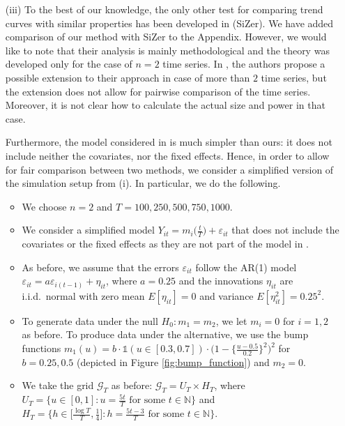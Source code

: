 \documentclass[a4paper,12pt]{article}
\begin{document}
\begin{enumerate}[label=\arabic*.,leftmargin=0.6cm]
{\begin{itemize}[topsep=0pt]
\item[(iii)] To the best of our knowledge, the only other test for comparing trend curves with similar properties has been developed in \cite{Park2009} (SiZer). We have added comparison of our method with SiZer to the Appendix. However, we would like to note that their analysis is mainly methodological and the theory was developed only for the case of $n=2$ time series. In \cite{Park2009}, the authors propose a possible extension to their approach in case of more than $2$ time series, but the extension does not allow for pairwise comparison of the time series. Moreover, it is not clear how to calculate the actual size and power in that case.

Furthermore, the model considered in \cite{Park2009} is much simpler than ours: it does not include neither the covariates, nor the fixed effects. Hence, in order to allow for fair comparison between two methods, we consider a simplified version of the simulation setup from (i). In particular, we do the following.

\begin{itemize}[label=--,leftmargin=0.45cm,itemsep=0pt]

\item We choose $n=2$ and $T=100,250,500, 750, 1000$.

\item We consider a simplified model $Y_{it} = m_i\big(\frac{t}{T}\big) + \varepsilon_{it}$ that does not include the covariates or the fixed effects as they are not part of the model in \cite{Park2009}.
\item As before, we assume that the errors $\varepsilon_{it}$ follow the AR(1) model $\varepsilon_{it} = a \varepsilon_{i(t-1)} + \eta_{it}$, where $a=0.25$ and the innovations $\eta_{it}$ are i.i.d.\ normal with zero mean $E[\eta_{it}]=0$ and variance $E[\eta_{it}^2]=0.25^2$. 

\item To generate data under the null $H_0: m_1 = m_2$, we let $m_i = 0$ for $i=1, 2$ as before. To produce data under the alternative, we use the bump functions $m_1(u) = b \cdot \mathbb{1}(u \in [0.3, 0.7]) \cdot \big(1 - \big\{\frac{u - 0.5}{0.2}\big\}^2\big)^2$ for $b = 0.25, 0.5$ (depicted in Figure \ref{fig:bump_function}) and $m_2 = 0$.

\item We take the grid $\mathcal{G}_T$ as before: $\mathcal{G}_T = U_T \times H_T$, where $U_T = \big\{ u \in [0,1]: u = \textstyle{\frac{5t}{T}} \text{ for some } t \in \mathbb{N} \big\}$ and $H_T = \big\{ h \in \big[ \textstyle{\frac{\log T}{T}}, \textstyle{\frac{1}{4}} \big]:  h = \textstyle{\frac{5t - 3}{T}} \text{ for some } t \in \mathbb{N} \big\}$.


\end{itemize}
\end{itemize}}
\end{enumerate}
\end{document}
